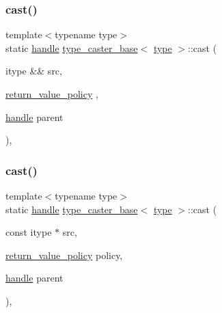 \mbox{\label{classtype__caster__base_abd0cc8e51c0882bb1b81710745295811}} 
\subsubsection{\texorpdfstring{cast()}{cast()}\hspace{0.1cm}{\footnotesize\ttfamily [2/3]}}
{\footnotesize\ttfamily template$<$typename type$>$ \\
static \mbox{\hyperlink{classhandle}{handle}} \mbox{\hyperlink{classtype__caster__base}{type\+\_\+caster\+\_\+base}}$<$ \mbox{\hyperlink{_s_d_l__opengl_8h_ad5ddf6fca7b585646515660e810e0188}{type}} $>$\+::cast (\begin{DoxyParamCaption}\item[{itype \&\&}]{src,  }\item[{\mbox{\hyperlink{detail_2common_8h_adde72ab1fb0dd4b48a5232c349a53841}{return\+\_\+value\+\_\+policy}}}]{,  }\item[{\mbox{\hyperlink{classhandle}{handle}}}]{parent }\end{DoxyParamCaption})\hspace{0.3cm}{\ttfamily [inline]}, {\ttfamily [static]}}

\mbox{\label{classtype__caster__base_a0fa8012ef36eabd7993fdd3adb4fbf92}} 
\subsubsection{\texorpdfstring{cast()}{cast()}\hspace{0.1cm}{\footnotesize\ttfamily [3/3]}}
{\footnotesize\ttfamily template$<$typename type$>$ \\
static \mbox{\hyperlink{classhandle}{handle}} \mbox{\hyperlink{classtype__caster__base}{type\+\_\+caster\+\_\+base}}$<$ \mbox{\hyperlink{_s_d_l__opengl_8h_ad5ddf6fca7b585646515660e810e0188}{type}} $>$\+::cast (\begin{DoxyParamCaption}\item[{const itype $\ast$}]{src,  }\item[{\mbox{\hyperlink{detail_2common_8h_adde72ab1fb0dd4b48a5232c349a53841}{return\+\_\+value\+\_\+policy}}}]{policy,  }\item[{\mbox{\hyperlink{classhandle}{handle}}}]{parent }\end{DoxyParamCaption})\hspace{0.3cm}{\ttfamily [inline]}, {\ttfamily [static]}}

